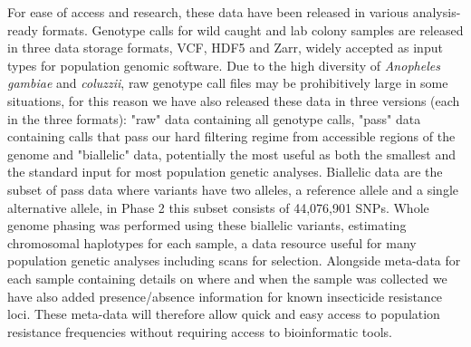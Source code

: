 \documentclass[a4paper,11pt,abstracton,hidelinks]{scrartcl}
\begin{document}
For ease of access and research, these data have been released in various analysis-ready formats.
%
Genotype calls for wild caught and lab colony samples are released in three data storage formats, VCF, HDF5 and Zarr, widely accepted as input types for population genomic software.
%
Due to the high diversity of \textit{Anopheles gambiae} and \textit{coluzzii}, raw genotype call files may be prohibitively large in some situations, for this reason we have also released these data in three versions (each in the three formats): 
%
"raw" data containing all genotype calls, "pass" data containing calls that pass our hard filtering regime from accessible regions of the genome and "biallelic" data, potentially the most useful as both the smallest and the standard input for most population genetic analyses.
%
Biallelic data are the subset of pass data where variants have two alleles, a reference allele and a single alternative allele, in Phase 2 this subset consists of 44,076,901 SNPs.
%
Whole genome phasing was performed using these biallelic variants, estimating chromosomal haplotypes for each sample, a data resource useful for many population genetic analyses including scans for selection.
%
Alongside meta-data for each sample containing details on where and when the sample was collected we have also added presence/absence information for known insecticide resistance loci.
%
These meta-data will therefore allow quick and easy access to population resistance frequencies without requiring access to bioinformatic tools. 
\end{document}
